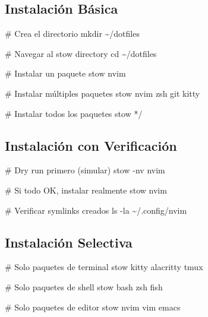 \documentclass[
  doc,
  floatsintext,
  longtable,
  a4paper,
  nolmodern,
  notxfonts,
  notimes,
  12pt,
  colorlinks=true,linkcolor=blue,citecolor=blue,urlcolor=blue]{apa7}
\newenvironment{Shaded}{\begin{snugshade}}{\end{snugshade}}
\newcommand{\AttributeTok}[1]{\textcolor[rgb]{0.40,0.45,0.13}{#1}}
\newcommand{\BuiltInTok}[1]{\textcolor[rgb]{0.00,0.23,0.31}{#1}}
\newcommand{\CommentTok}[1]{\textcolor[rgb]{0.37,0.37,0.37}{#1}}
\newcommand{\ExtensionTok}[1]{\textcolor[rgb]{0.00,0.23,0.31}{#1}}
\newcommand{\FunctionTok}[1]{\textcolor[rgb]{0.28,0.35,0.67}{#1}}
\newcommand{\NormalTok}[1]{\textcolor[rgb]{0.00,0.23,0.31}{#1}}
\newcommand{\PreprocessorTok}[1]{\textcolor[rgb]{0.68,0.00,0.00}{#1}}
\begin{document}
\subsection{Instalación Básica}\label{instalaciuxf3n-buxe1sica}

\begin{Shaded}
\begin{Highlighting}[]
\CommentTok{\# Crea el directorio}
\FunctionTok{mkdir}\NormalTok{ \textasciitilde{}/dotfiles}

\CommentTok{\# Navegar al stow directory}
\BuiltInTok{cd}\NormalTok{ \textasciitilde{}/dotfiles}

\CommentTok{\# Instalar un paquete}
\ExtensionTok{stow}\NormalTok{ nvim}

\CommentTok{\# Instalar múltiples paquetes}
\ExtensionTok{stow}\NormalTok{ nvim zsh git kitty}

\CommentTok{\# Instalar todos los paquetes}
\ExtensionTok{stow} \PreprocessorTok{*}\NormalTok{/}
\end{Highlighting}
\end{Shaded}

\subsection{Instalación con
Verificación}\label{instalaciuxf3n-con-verificaciuxf3n}

\begin{Shaded}
\begin{Highlighting}[]
\CommentTok{\# Dry run primero (simular)}
\ExtensionTok{stow} \AttributeTok{{-}nv}\NormalTok{ nvim}

\CommentTok{\# Si todo OK, instalar realmente}
\ExtensionTok{stow}\NormalTok{ nvim}

\CommentTok{\# Verificar symlinks creados}
\FunctionTok{ls} \AttributeTok{{-}la}\NormalTok{ \textasciitilde{}/.config/nvim}
\end{Highlighting}
\end{Shaded}

\subsection{Instalación Selectiva}\label{instalaciuxf3n-selectiva}

\begin{Shaded}
\begin{Highlighting}[]
\CommentTok{\# Solo paquetes de terminal}
\ExtensionTok{stow}\NormalTok{ kitty alacritty tmux}

\CommentTok{\# Solo paquetes de shell}
\ExtensionTok{stow}\NormalTok{ bash zsh fish}

\CommentTok{\# Solo paquetes de editor}
\ExtensionTok{stow}\NormalTok{ nvim vim emacs}
\end{Highlighting}
\end{Shaded}
\end{document}
